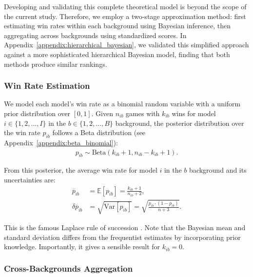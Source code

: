 \documentclass{article}
\begin{document}
Developing and validating this complete theoretical model is beyond the scope of the current study. Therefore, we employ a two-stage approximation method: first estimating win rates within each background using Bayesian inference, then aggregating across backgrounds using standardized scores. In Appendix~\ref{appendix:hierarchical_bayesian}, we validated this simplified approach against a more sophisticated hierarchical Bayesian model, finding that both methods produce similar rankings.

\subsubsection{Win Rate Estimation}
\label{sec:win_rate_estimation}

We model each model's win rate as a binomial random variable with a uniform prior distribution over $[0,1]$. Given $n_{ib}$ games with $k_{ib}$ wins for model $i\in\{1,2,\dots,I\}$ in the $b\in\{1,2,\dots,B\}$ background, the posterior distribution over the win rate $p_{ib}$ follows a Beta distribution (see Appendix~\ref{appendix:beta_binomial}):
\begin{align}
p_{ib}\sim \text{Beta}(k_{ib} + 1, n_{ib} - k_{ib} + 1).
\end{align}

From this posterior, the average win rate for model $i$ in the $b$ background and its uncertainties are:
\begin{align}
\overline{p}_{ib} & = \mathbb{E}[p_{ib}] = \frac{k_{ib} + 1}{n_{ib} + 2} \label{winrate},\\
\delta\overline{p}_{ib} & =\sqrt{\textrm{Var}[p_{ib}]} = \sqrt{\frac{\overline{p}_{ib} \cdot (1 - \overline{p}_{ib})}{n + 3}}.
\label{uncertainty}
\end{align}

This is the famous Laplace rule of succession \cite{Laplace1812}. Note that the Bayesian mean and standard deviation differs from the frequentist estimates by incorporating prior knowledge. Importantly, it gives a sensible result for $k_{ib}=0$.

\subsubsection{Cross-Backgrounds Aggregation}
\label{sec:aggregating_accross_backgrounds}
\end{document}
